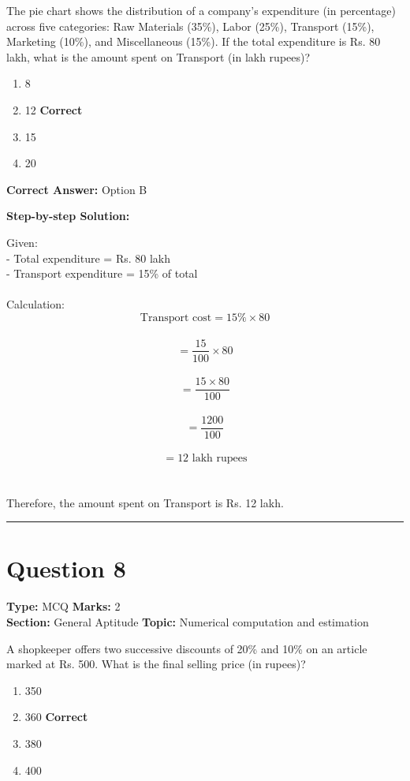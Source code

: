 \documentclass[11pt]{article}
\begin{document}
The pie chart shows the distribution of a company's expenditure (in percentage) across five categories: Raw Materials (35\%), Labor (25\%), Transport (15\%), Marketing (10\%), and Miscellaneous (15\%). If the total expenditure is Rs. 80 lakh, what is the amount spent on Transport (in lakh rupees)?


\begin{enumerate}[label=\textbf{\Alph*.}, leftmargin=1.8em]
\item 8\item 12 \hfill {\color{gategreen}\textbf{Correct}}\item 15\item 20\end{enumerate}

\textbf{Correct Answer:} Option B

\textbf{Step-by-step Solution:}

Given:\\
 - Total expenditure = Rs. 80 lakh\\
 - Transport expenditure = 15\% of total\\
\\
 Calculation:\\
 \[\text{Transport cost} = 15\% \times 80\]\\
 \[= \frac{15}{100} \times 80\]\\
 \[= \frac{15 \times 80}{100}\]\\
 \[= \frac{1200}{100}\]\\
 \[= 12 \text{ lakh rupees}\]\\
\\
 Therefore, the amount spent on Transport is Rs. 12 lakh.

\vspace{0.8em}
\hrule
\vspace{0.4em}
\section*{Question 8}
\textbf{Type:} MCQ \hfill \textbf{Marks:} 2\\
\textbf{Section:} General Aptitude \hfill \textbf{Topic:} Numerical computation and estimation

A shopkeeper offers two successive discounts of 20\% and 10\% on an article marked at Rs. 500. What is the final selling price (in rupees)?


\begin{enumerate}[label=\textbf{\Alph*.}, leftmargin=1.8em]
\item 350\item 360 \hfill {\color{gategreen}\textbf{Correct}}\item 380\item 400\end{enumerate}
\end{document}
